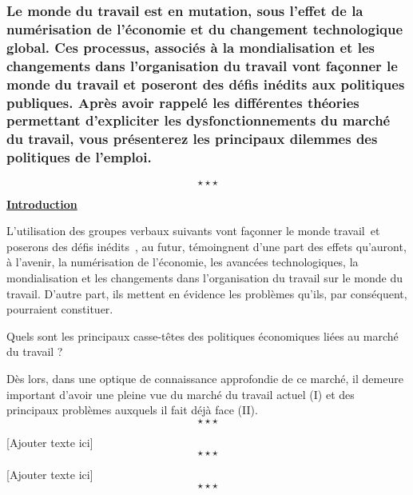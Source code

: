 \newpage %
	\subsubsection*{Le monde du travail est en mutation, sous l’effet de la numérisation de l’économie et du changement technologique global. Ces processus, associés à la mondialisation et les changements dans l’organisation du travail vont façonner le monde du travail et poseront des défis inédits aux politiques publiques. \newline \newline Après avoir rappelé les différentes théories permettant d’expliciter les dysfonctionnements du marché du travail, vous présenterez les principaux dilemmes des politiques de l’emploi.
	}
$$\star \star \star$$

%

\begin{center}
	\textbf{\underline{Introduction}} 
\end{center}

L'utilisation des groupes verbaux suivants \guillemetleft vont façonner le monde travail\guillemetright\ et \guillemetleft poserons des défis inédits\guillemetright\ , au futur, témoingnent d'une part des effets qu'auront, à l'avenir, la numérisation de l'économie, les avancées technologiques, la mondialisation et les changements dans l'organisation du travail sur le monde du travail. D'autre part, ils mettent en évidence les problèmes qu'ils, par conséquent, pourraient constituer. 

Quels sont les principaux casse-têtes des politiques économiques liées au marché du travail ?\newline

Dès lors, dans une optique de connaissance approfondie de ce marché, il demeure important d'avoir une pleine vue du marché du travail actuel (I) et des principaux problèmes auxquels il fait déjà face (II). $$\star \star \star$$

[Ajouter texte ici] $$\star \star \star$$
	
[Ajouter texte ici] $$\star \star \star$$
